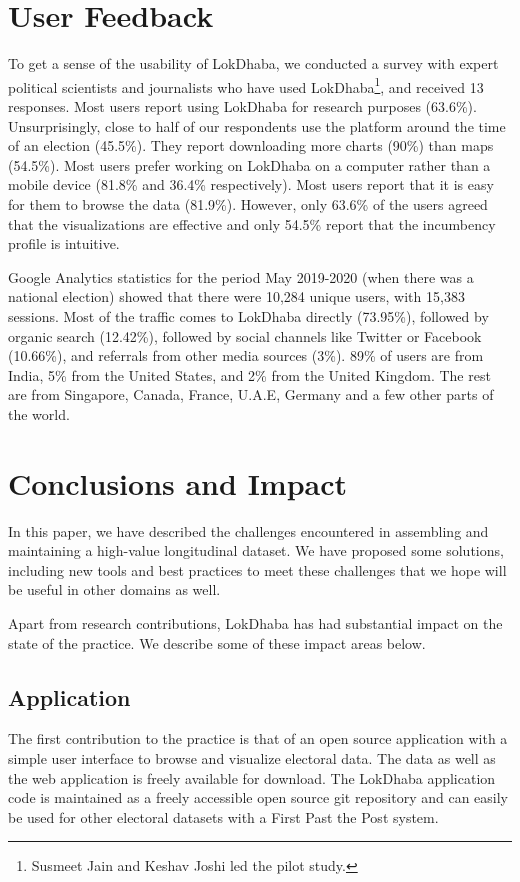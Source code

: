 \section{User Feedback}
To get a sense of the usability of LokDhaba, we conducted a survey with expert political scientists and journalists who have used LokDhaba\footnote{Susmeet Jain and Keshav Joshi led the pilot study.}, and received 13 responses. Most users report using LokDhaba for research purposes (63.6\%). Unsurprisingly, close to half of our respondents use the platform around the time of an election (45.5\%). They report downloading more charts (90\%) than maps (54.5\%). Most users prefer working on LokDhaba on a computer rather than a mobile device (81.8\% and 36.4\% respectively). Most users report that it is easy for them to browse the data (81.9\%). However, only 63.6\% of the users agreed that the visualizations are effective and only 54.5\% report that the incumbency profile is intuitive.

Google Analytics statistics for the period May 2019-2020 (when there was a national election) showed that there were 10,284 unique users, with 15,383 sessions. Most of the traffic comes to LokDhaba directly (73.95\%), followed by organic search (12.42\%), followed by social channels like Twitter or Facebook (10.66\%), and referrals from other media sources (3\%). 89\% of users are from India, 5\% from the United States, and 2\% from the United Kingdom. The rest are from Singapore, Canada, France, U.A.E, Germany and a few other parts of the world.

\section{Conclusions and Impact}

In this paper, we have described the challenges encountered in assembling and maintaining a high-value longitudinal dataset. We have proposed some solutions, including new tools and best practices to meet these challenges that we hope will be useful in other domains as well.

Apart from research contributions, LokDhaba has had substantial impact on the state of the practice. We describe some of these impact areas below.

\subsection{Application}

The first contribution to the practice is that of an open source application with a simple user interface to browse and visualize electoral data. The data as well as the web application is freely available for download. The LokDhaba application code is maintained as a freely accessible open source git repository\cite{lokdhabaRepo} and can easily be used for other electoral datasets with a First Past the Post system.

